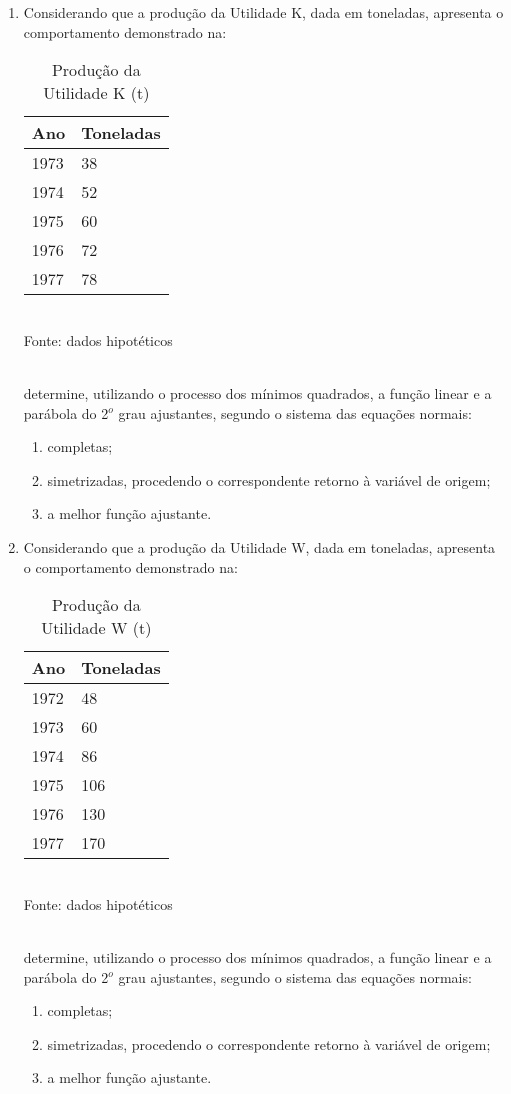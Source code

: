 \begin{enumerate}[resume]
\item Considerando que a produção da Utilidade K, dada em toneladas, apresenta o comportamento demonstrado na:
	\begin{table}[!htb]
	\centering
	\caption{Produção da Utilidade K (t)}
	\vspace{0.5cm}
	\begin{tabular}{ll}
	Ano & Toneladas \\
	\hline 
	1973 & 38 \\
	1974 & 52 \\
	1975 & 60 \\
	1976 & 72 \\
	1977 & 78 \\
	\end{tabular}\\
	Fonte: dados hipotéticos
	\end{table}
	\\
	determine, utilizando o processo dos mínimos quadrados, a função linear e a parábola do 2$^o$ grau ajustantes, segundo o sistema das equações normais:
	\begin{enumerate}
	\item completas;
	\item simetrizadas, procedendo o correspondente retorno à variável de origem;
	\item a melhor função ajustante.
	\end{enumerate}	

\item Considerando que a produção da Utilidade W, dada em toneladas, apresenta o comportamento demonstrado na:
	\begin{table}[!htb]
	\centering
	\caption{Produção da Utilidade W (t)}
	\vspace{0.5cm}
	\begin{tabular}{ll}
	Ano & Toneladas \\
	\hline 
	1972 & 48 \\
	1973 & 60 \\
	1974 & 86 \\
	1975 & 106 \\
	1976 & 130 \\
	1977 & 170 \\
	\end{tabular}\\
	Fonte: dados hipotéticos
	\end{table}
	\\
	determine, utilizando o processo dos mínimos quadrados, a função linear e a parábola do 2$^o$ grau ajustantes, segundo o sistema das equações normais:
	\begin{enumerate}
	\item completas;
	\item simetrizadas, procedendo o correspondente retorno à variável de origem;
	\item a melhor função ajustante.
	\end{enumerate}		
	

\end{enumerate}
